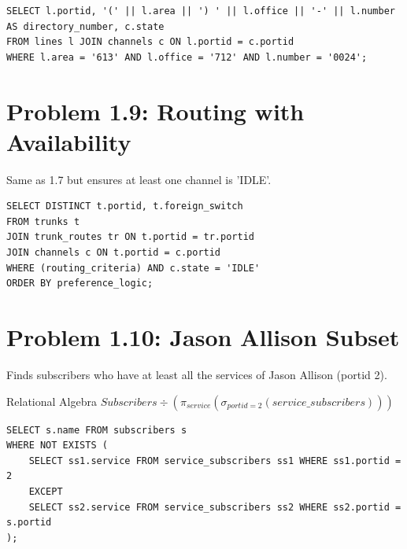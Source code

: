 \documentclass[12pt]{article}
\begin{document}
\begin{lstlisting}
SELECT l.portid, '(' || l.area || ') ' || l.office || '-' || l.number AS directory_number, c.state
FROM lines l JOIN channels c ON l.portid = c.portid
WHERE l.area = '613' AND l.office = '712' AND l.number = '0024';
\end{lstlisting}

\section{Problem 1.9: Routing with Availability}
Same as 1.7 but ensures at least one channel is 'IDLE'.

\begin{lstlisting}
SELECT DISTINCT t.portid, t.foreign_switch
FROM trunks t
JOIN trunk_routes tr ON t.portid = tr.portid
JOIN channels c ON t.portid = c.portid
WHERE (routing_criteria) AND c.state = 'IDLE'
ORDER BY preference_logic;
\end{lstlisting}

\section{Problem 1.10: Jason Allison Subset}
Finds subscribers who have at least all the services of Jason Allison (portid 2).

\begin{raguery}{Relational Algebra}
    $Subscribers \div (\pi_{service}(\sigma_{portid=2}(service\_subscribers)))$
\end{raguery}

\begin{lstlisting}
SELECT s.name FROM subscribers s
WHERE NOT EXISTS (
    SELECT ss1.service FROM service_subscribers ss1 WHERE ss1.portid = 2
    EXCEPT
    SELECT ss2.service FROM service_subscribers ss2 WHERE ss2.portid = s.portid
);
\end{lstlisting}
\end{document}
